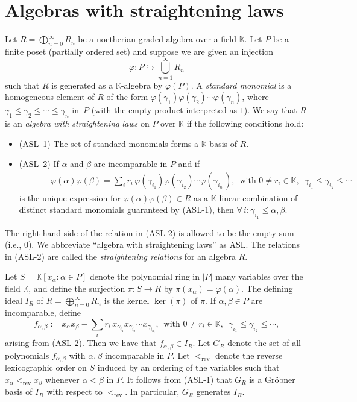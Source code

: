 \documentclass[12pt,a4paper]{amsart}
\let\to=\rightarrow
\theoremstyle{definition}
\begin{document}
\section{Algebras with straightening laws}\label{sec: 1}
Let $R = \bigoplus_{n=0}^{\infty} R_n$ be a noetherian graded algebra over a field ${\mathbb K}$.  Let $P$ be a finite poset (partially ordered set) and suppose we are given an injection
\[
\varphi: P \hookrightarrow \bigcup_{n=1}^{\infty} R_n
\]
such that $R$ is generated as a ${\mathbb K}$-algebra by $\varphi(P)$.  A {\em standard monomial} is a homogeneous element of $R$ of the form $\varphi(\gamma_1) \varphi(\gamma_2)\cdots \varphi(\gamma_n)$, where $\gamma_1 \leq \gamma_2 \leq \cdots \leq \gamma_n$ in~$P$ (with the empty product interpreted as $1$).  We say that $R$ is an \emph{algebra with straightening laws} \cite{Eisenbud80} on $P$ over $\mathbb{K}$  if the following conditions hold:
\begin{itemize}
\item[]
(ASL\,-1)
The set of standard monomials forms a $\mathbb{K}$-basis of $R$.
\item[]
(ASL\,-2)
If $\alpha$ and $\beta$  are incomparable in $P$ and if
\begin{eqnarray}
\label{ASL}
\, \, \, \, \, \, \, \, \, \, \, \, \, \, \, \, \, \, \, \, 
\varphi(\alpha)\varphi(\beta) 
= \sum_{i} r_i\,\varphi(\gamma_{i_1}) \varphi(\gamma_{i_2})\cdots \varphi(\gamma_{i_{n_i}}), \, \text{ with } 0 \neq r_i \in {\mathbb K}, \, \, \, \gamma_{i_1}\leq \gamma_{i_2} \leq \cdots 
\end{eqnarray}
is the unique expression for $\varphi(\alpha)\varphi(\beta) \in R$ as a $\mathbb{K}$-linear combination of distinct standard monomials guaranteed by (ASL-1), then $\forall \, i: \gamma_{i_1} \leq \alpha, \beta$. 
\end{itemize}
The right-hand side of the relation in (ASL-2) is allowed to be the empty sum (i.e., $0$). We abbreviate ``algebra with straightening laws'' as ASL. The relations in (ASL-2) are called the \emph{straightening relations} for an algebra $R$.

Let $S=\mathbb{K}[x_{\alpha} : \alpha \in P]$ denote the polynomial ring in $|P|$ many variables over the field $\mathbb{K}$, and define the surjection $\pi: S \to R$ by $\pi(x_\alpha) = \varphi(\alpha)$. The defining ideal $I_R$ of $R=\bigoplus_{n=0}^{\infty} R_n$ is the kernel $\ker(\pi)$ of $\pi$. If $\alpha,\beta \in P$ are incomparable, define
\[
f_{\alpha,\beta}
:= x_\alpha x_\beta - \sum_{i} r_i\,x_{\gamma_{i_1}}x_{\gamma_{i_2}} \cdots x_{\gamma_{i_{n_i}}}, \, \text{ with } 0 \neq r_i \in {\mathbb K}, \, \, \, \gamma_{i_1}\leq \gamma_{i_2} \leq \cdots,
\]
arising from (ASL-2). Then we have that $f_{\alpha,\beta} \in I_R$. Let $G_R$ denote the set of all polynomials $f_{\alpha,\beta}$ with $\alpha,\beta$ incomparable in $P$. Let $<_{\mathrm{rev}}$ denote the reverse lexicographic order \cite[Example~2.1.2(b)]{HHgtm260} on $S$ induced by an ordering of the variables such that $x_{\alpha} <_{\mathrm{rev}} x_{\beta}$ whenever $\alpha < \beta$ in $P$. It follows from (ASL-1) that $G_R$ is a Gröbner basis of $I_R$ with respect to $<_{\mathrm{rev}}$. In particular, $G_R$ generates $I_R$.
\end{document}

